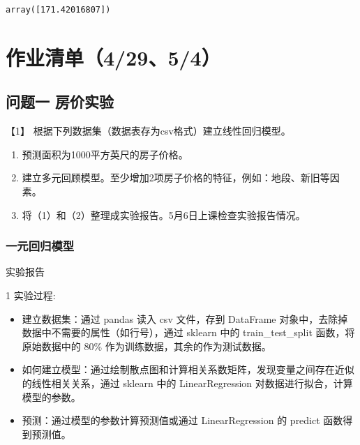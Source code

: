 \documentclass[11pt]{article}
\makeatletter
\providecommand{\tightlist}{%
      \setlength{\itemsep}{0pt}\setlength{\parskip}{0pt}}
\newcommand{\boxspacing}{\kern\kvtcb@left@rule\kern\kvtcb@boxsep}
\newcommand{\prompt}[4]{
        \ttfamily\llap{{\color{#2}[#3]:\hspace{3pt}#4}}\vspace{-\baselineskip}
    }
\makeatother
\begin{document}
            \begin{tcolorbox}[breakable, size=fbox, boxrule=.5pt, pad at break*=1mm, opacityfill=0]
\prompt{Out}{outcolor}{244}{\boxspacing}
\begin{Verbatim}[commandchars=\\\{\}]
array([171.42016807])
\end{Verbatim}
\end{tcolorbox}
        
    \hypertarget{ux4f5cux4e1aux6e05ux535542954}{%
\section{作业清单（4/29、5/4）}\label{ux4f5cux4e1aux6e05ux535542954}}

    \hypertarget{ux95eeux9898ux4e00-ux623fux4ef7ux5b9eux9a8c}{%
\subsection{问题一
房价实验}\label{ux95eeux9898ux4e00-ux623fux4ef7ux5b9eux9a8c}}

    【1】 根据下列数据集（数据表存为csv格式）建立线性回归模型。

    \begin{enumerate}
\def\labelenumi{(\arabic{enumi})}
\item
  预测面积为1000平方英尺的房子价格。
\item
  建立多元回顾模型。至少增加2项房子价格的特征，例如：地段、新旧等因素。
\item
  将（1）和（2）整理成实验报告。5月6日上课检查实验报告情况。
\end{enumerate}

    \hypertarget{ux4e00ux5143ux56deux5f52ux6a21ux578b}{%
\subsubsection{一元回归模型}\label{ux4e00ux5143ux56deux5f52ux6a21ux578b}}

    实验报告

1 实验过程:

\begin{itemize}
\tightlist
\item
  建立数据集：通过 pandas 读入 csv 文件，存到 DataFrame
  对象中，去除掉数据中不需要的属性（如行号），通过 sklearn 中的
  train\_test\_split 函数，将原始数据中的 80\%
  作为训练数据，其余的作为测试数据。
\item
  如何建立模型：通过绘制散点图和计算相关系数矩阵，发现变量之间存在近似的线性相关关系，通过
  sklearn 中的 LinearRegression 对数据进行拟合，计算模型的参数。
\item
  预测：通过模型的参数计算预测值或通过 LinearRegression 的 predict
  函数得到预测值。
\end{itemize}
\end{document}
